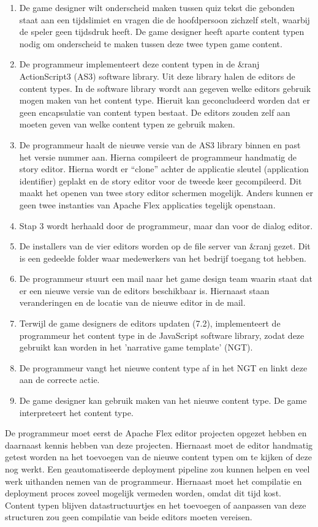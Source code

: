 \begin{enumerate}
    \item De game designer wilt onderscheid maken tussen quiz tekst die gebonden staat aan een tijdslimiet en vragen die de hoofdpersoon zichzelf stelt, waarbij de speler geen tijdsdruk heeft. De game designer heeft aparte content typen nodig om onderscheid te maken tussen deze twee typen game content.
    \item De programmeur implementeert deze content typen in de \&ranj ActionScript3 (AS3) software library. Uit deze library halen de editors de content types. In de software library wordt aan gegeven welke editors gebruik mogen maken van het content type. Hieruit kan geconcludeerd worden dat er geen encapsulatie van content typen bestaat. De editors zouden zelf aan moeten geven van welke content typen ze gebruik maken.
    \item De programmeur haalt de nieuwe versie van de AS3 library binnen en past het versie nummer aan. Hierna compileert de programmeur handmatig de story editor. Hierna wordt er “clone” achter de applicatie sleutel (application identifier) geplakt en de story editor voor de tweede keer gecompileerd. Dit maakt het openen van twee story editor schermen mogelijk. Anders kunnen er geen twee instanties van Apache Flex applicaties tegelijk openstaan.
    \item Stap 3 wordt herhaald door de programmeur, maar dan voor de dialog editor.
    \item De installers van de vier editors worden op de file server van \&ranj gezet. Dit is een gedeelde folder waar medewerkers van het bedrijf toegang tot hebben.
    \item De programmeur stuurt een mail naar het game design team waarin staat dat er een nieuwe versie van de editors beschikbaar is. Hiernaast staan veranderingen en de locatie van de nieuwe editor in de mail.
    \item Terwijl de game designers de editors updaten (7.2), implementeert de programmeur het content type in de JavaScript software library, zodat deze gebruikt kan worden in het 'narrative game template' (NGT).
    \item De programmeur vangt het nieuwe content type af in het NGT en linkt deze aan de correcte actie.
    \item De game designer kan gebruik maken van het nieuwe content type. De game interpreteert het content type.
\end{enumerate}

\noindent De programmeur moet eerst de Apache Flex editor projecten opgezet hebben en daarnaast kennis hebben van deze projecten. Hiernaast moet de editor handmatig getest worden na het toevoegen van de nieuwe content typen om te kijken of deze nog werkt.
Een geautomatiseerde deployment pipeline zou kunnen helpen en veel werk uithanden nemen van de programmeur. Hiernaast moet het compilatie en deployment proces zoveel mogelijk vermeden worden, omdat dit tijd kost. Content typen blijven datastructuurtjes en het toevoegen of aanpassen van deze structuren zou geen compilatie van beide editors moeten vereisen.

